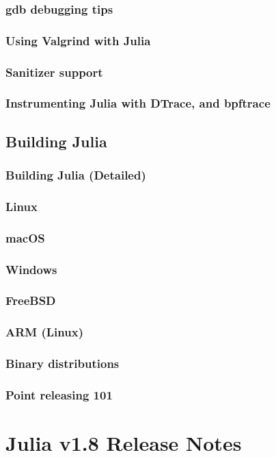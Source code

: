     \section{gdb debugging tips}
    \section{Using Valgrind with Julia}
    \section{Sanitizer support}
    \section{Instrumenting Julia with DTrace, and bpftrace}
\chapter{Building Julia}
    \section{Building Julia (Detailed)}
    \section{Linux}
    \section{macOS}
    \section{Windows}
    \section{FreeBSD}
    \section{ARM (Linux)}
    \section{Binary distributions}
    \section{Point releasing 101}




\part{Julia v1.8 Release Notes}
